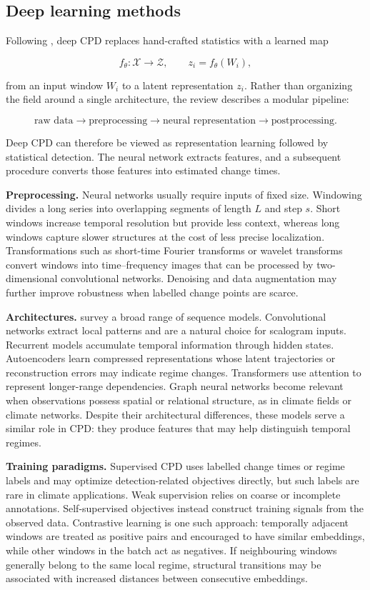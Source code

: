 \documentclass[
]{krantz}
\begin{document}
\subsection{Deep learning methods}\label{deep-learning-methods}

Following \citep{xu2025}, deep CPD replaces hand-crafted statistics with a learned map

\[
f_\theta:\mathcal{X}\to\mathcal{Z},
\qquad
z_i=f_\theta(W_i),
\]

from an input window \(W_i\) to a latent representation \(z_i\). Rather than organizing the field around a single architecture, the review describes a modular pipeline:

\[
\text{raw data}
\rightarrow
\text{preprocessing}
\rightarrow
\text{neural representation}
\rightarrow
\text{postprocessing}.
\]

Deep CPD can therefore be viewed as representation learning followed by statistical detection. The neural network extracts features, and a subsequent procedure converts those features into estimated change times.

\textbf{Preprocessing.} Neural networks usually require inputs of fixed size. Windowing divides a long series into overlapping segments of length \(L\) and step \(s\). Short windows increase temporal resolution but provide less context, whereas long windows capture slower structures at the cost of less precise localization. Transformations such as short-time Fourier transforms or wavelet transforms convert windows into time--frequency images that can be processed by two-dimensional convolutional networks. Denoising and data augmentation may further improve robustness when labelled change points are scarce.

\textbf{Architectures.} \citep{xu2025} survey a broad range of sequence models. Convolutional networks extract local patterns and are a natural choice for scalogram inputs. Recurrent models accumulate temporal information through hidden states. Autoencoders learn compressed representations whose latent trajectories or reconstruction errors may indicate regime changes. Transformers use attention to represent longer-range dependencies. Graph neural networks become relevant when observations possess spatial or relational structure, as in climate fields or climate networks. Despite their architectural differences, these models serve a similar role in CPD: they produce features that may help distinguish temporal regimes.

\textbf{Training paradigms.} Supervised CPD uses labelled change times or regime labels and may optimize detection-related objectives directly, but such labels are rare in climate applications. Weak supervision relies on coarse or incomplete annotations. Self-supervised objectives instead construct training signals from the observed data. Contrastive learning is one such approach: temporally adjacent windows are treated as positive pairs and encouraged to have similar embeddings, while other windows in the batch act as negatives. If neighbouring windows generally belong to the same local regime, structural transitions may be associated with increased distances between consecutive embeddings.
\end{document}
